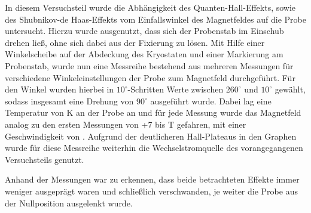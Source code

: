 
In diesem Versuchsteil wurde die Abhängigkeit des Quanten-Hall-Effekts, sowie des Shubnikov-de Haas-Effekts vom Einfallswinkel des Magnetfeldes auf die Probe untersucht. Hierzu wurde ausgenutzt, dass sich der Probenstab im Einschub drehen ließ, ohne sich dabei aus der Fixierung zu lösen. 
Mit Hilfe einer Winkelscheibe auf der Abdeckung des Kryostaten und einer Markierung am Probenstab, wurde nun eine Messreihe bestehend aus mehreren Messungen für verschiedene Winkeleinstellungen der Probe zum Magnetfeld durchgeführt. Für den Winkel wurden hierbei in $10^\circ$-Schritten Werte zwischen $260^\circ$ und $10^\circ$  gewählt, sodass insgesamt eine Drehung von $90^\circ$ ausgeführt wurde. Dabei lag eine Temperatur von \unit[2]{K} an der Probe an und für jede Messung wurde das Magnetfeld analog zu den ersten Messungen von +7 bis \unit[-7]{T} gefahren, mit einer Geschwindigkeit von . Aufgrund der deutlicheren Hall-Plateaus in den Graphen wurde für diese Messreihe weiterhin die Wechselstromquelle des vorangegangenen Versuchsteils genutzt. 

Anhand der Messungen war zu erkennen, dass beide betrachteten Effekte immer weniger ausgeprägt waren und schließlich verschwanden, je weiter die Probe aus der Nullposition ausgelenkt wurde. 


